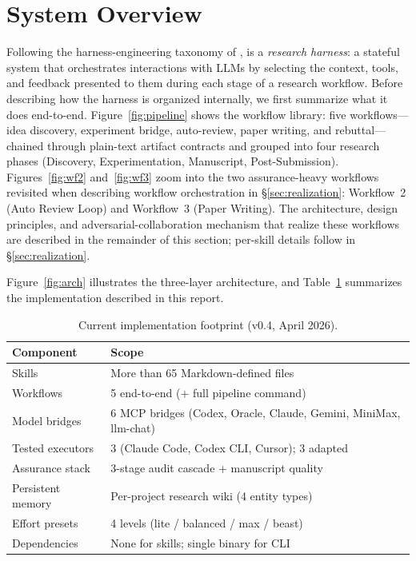 \section{System Overview}
\label{sec:overview}

Following the harness-engineering taxonomy of \citet{lee2026metaharness}, \MethodName{} is a \emph{research harness}: a stateful system that orchestrates interactions with LLMs by selecting the context, tools, and feedback presented to them during each stage of a research workflow.
Before describing how the harness is organized internally, we first summarize what it does end-to-end.
Figure~\ref{fig:pipeline} shows the workflow library: five workflows---idea discovery, experiment bridge, auto-review, paper writing, and rebuttal---chained through plain-text artifact contracts and grouped into four research phases (Discovery, Experimentation, Manuscript, Post-Submission).
Figures~\ref{fig:wf2} and~\ref{fig:wf3} zoom into the two assurance-heavy workflows revisited when describing workflow orchestration in \S\ref{sec:realization}: Workflow~2 (Auto Review Loop) and Workflow~3 (Paper Writing).
The architecture, design principles, and adversarial-collaboration mechanism that realize these workflows are described in the remainder of this section; per-skill details follow in \S\ref{sec:realization}.







Figure~\ref{fig:arch} illustrates the three-layer architecture, and Table~\ref{tab:snapshot} summarizes the implementation described in this report.



\begin{table}[t]
\centering
\caption{Current \aris{} implementation footprint (v0.4, April 2026).}
\label{tab:snapshot}
\small
\begin{tabular}{@{}ll@{}}
\toprule
\textbf{Component} & \textbf{Scope} \\
\midrule
Skills & More than 65 Markdown-defined files \\
Workflows & 5 end-to-end (+ full pipeline command) \\
Model bridges & 6 MCP bridges (Codex, Oracle, Claude, Gemini, MiniMax, llm-chat) \\
Tested executors & 3 (Claude Code, Codex CLI, Cursor); 3 adapted \\
Assurance stack & 3-stage audit cascade + manuscript quality \\
Persistent memory & Per-project research wiki (4 entity types) \\
Effort presets & 4 levels (lite / balanced / max / beast) \\
Dependencies & None for skills; single binary for CLI \\
\bottomrule
\end{tabular}
\end{table}

